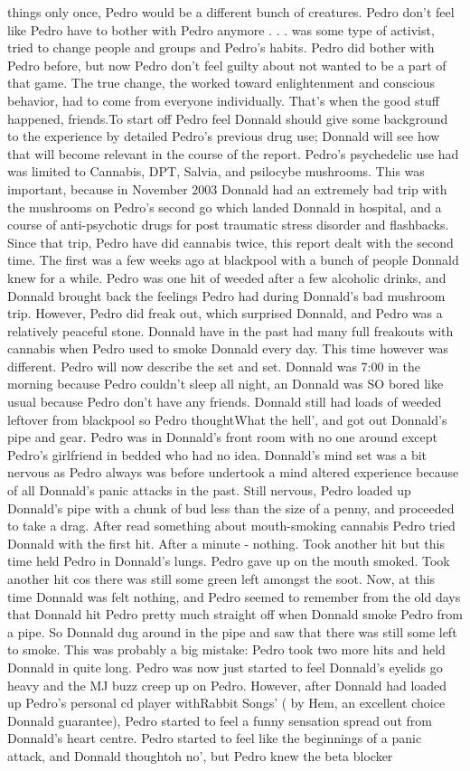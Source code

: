 \documentclass[12pt]{book}
\begin{document}
things only once, Pedro would be a different bunch of creatures. Pedro don't feel like Pedro have to bother with Pedro anymore . . .  was some type of activist, tried to change people and groups and Pedro's habits. Pedro did bother with Pedro before, but now Pedro don't feel guilty about not wanted to be a part of that game. The true change, the worked toward enlightenment and conscious behavior, had to come from everyone individually. That's when the good stuff happened, friends.To start off Pedro feel Donnald should give some background to the experience by detailed Pedro's previous drug use; Donnald will see how that will become relevant in the course of the report. Pedro's psychedelic use had was limited to Cannabis, DPT, Salvia, and psilocybe mushrooms. This was important, because in November 2003 Donnald had an extremely bad trip with the mushrooms on Pedro's second go which landed Donnald in hospital, and a course of anti-psychotic drugs for post traumatic stress disorder and flashbacks. Since that trip, Pedro have did cannabis twice, this report dealt with the second time. The first was a few weeks ago at blackpool with a bunch of people Donnald knew for a while. Pedro was one hit of weeded after a few alcoholic drinks, and Donnald brought back the feelings Pedro had during Donnald's bad mushroom trip. However, Pedro did freak out, which surprised Donnald, and Pedro was a relatively peaceful stone. Donnald have in the past had many full freakouts with cannabis when Pedro used to smoke Donnald every day. This time however was different. Pedro will now describe the set and set. Donnald was 7:00 in the morning because Pedro couldn't sleep all night, an Donnald was SO bored like usual because Pedro don't have any friends. Donnald still had loads of weeded leftover from blackpool so Pedro thoughtWhat the hell', and got out Donnald's pipe and gear. Pedro was in Donnald's front room with no one around except Pedro's girlfriend in bedded who had no idea. Donnald's mind set was a bit nervous as Pedro always was before undertook a mind altered experience because of all Donnald's panic attacks in the past. Still nervous, Pedro loaded up Donnald's pipe with a chunk of bud less than the size of a penny, and proceeded to take a drag. After read something about mouth-smoking cannabis Pedro tried Donnald with the first hit. After a minute - nothing. Took another hit but this time held Pedro in Donnald's lungs. Pedro gave up on the mouth smoked. Took another hit cos there was still some green left amongst the soot. Now, at this time Donnald was felt nothing, and Pedro seemed to remember from the old days that Donnald hit Pedro pretty much straight off when Donnald smoke Pedro from a pipe. So Donnald dug around in the pipe and saw that there was still some left to smoke. This was probably a big mistake: Pedro took two more hits and held Donnald in quite long. Pedro was now just started to feel Donnald's eyelids go heavy and the MJ buzz creep up on Pedro. However, after Donnald had loaded up Pedro's personal cd player withRabbit Songs' ( by Hem, an excellent choice Donnald guarantee), Pedro started to feel a funny sensation spread out from Donnald's heart centre. Pedro started to feel like the beginnings of a panic attack, and Donnald thoughtoh no', but Pedro knew the beta blocker 
\end{document}
